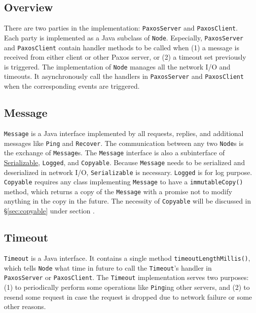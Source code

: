 \documentclass{article}
\numberwithin{equation}{section}
\begin{document}
\subsection{Overview}
There are two parties in the implementation: \verb|PaxosServer| and \verb|PaxosClient|. Each party is implemented as a Java subclass of \verb|Node|. Especially, \verb|PaxosServer| and \verb|PaxosClient| contain handler methods to be called when (1) a message is received from either client or other Paxos server, or (2) a timeout set previously is triggered. The implementation of \verb|Node| manages all the network I/O and timeouts. It asynchronously call the handlers in \verb|PaxosServer| and \verb|PaxosClient| when the corresponding events are triggered.

\subsection{Message}\label{sec:message}
\verb|Message| is a Java interface implemented by all requests, replies, and additional messages like \verb|Ping| and \verb|Recover|. The communication between any two \verb|Node|s is the exchange of \verb|Message|s. The \verb|Message| interface is also a subinterface of \href{https://docs.oracle.com/javase/8/docs/api/java/io/Serializable.html}{Serializable}, \verb|Logged|, and \verb|Copyable|. Because \verb|Message| needs to be serialized and deserialized in network I/O, \verb|Serializable| is necessary. \verb|Logged| is for log purpose. \verb|Copyable| requires any class implementing \verb|Message| to have a \verb|immutableCopy()| method, which returns a copy of the \verb|Message| with a promise not to modify anything in the copy in the future. The necessity of \verb|Copyable| will be discussed in \S\ref{sec:copyable} under section .

\subsection{Timeout}
\verb|Timeout| is a Java interface. It contains a single method \verb|timeoutLengthMillis()|, which tells \verb|Node| what time in future to call the \verb|Timeout|'s handler in \verb|PaxosServer| or \verb|PaxosClient|. The \verb|Timeout| implementation serves two purposes: (1) to periodically perform some operations like \verb|Ping|ing other servers, and (2) to resend some request in case the request is dropped due to network failure or some other reasons.
\end{document}
